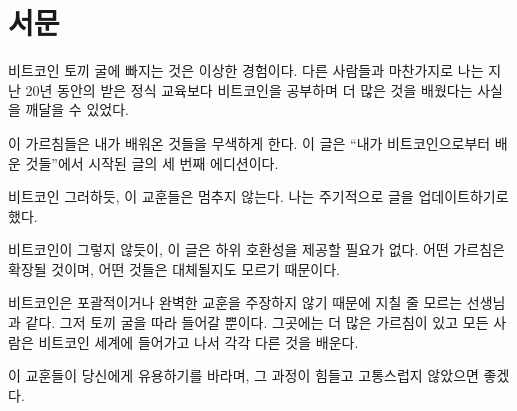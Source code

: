 \chapter*{서문}

비트코인 토끼 굴에 빠지는 것은 이상한 경험이다. 
다른 사람들과 마찬가지로 나는 지난 20년 동안의 받은 정식 교육보다 비트코인을 공부하며
더 많은 것을 배웠다는 사실을 깨달을 수 있었다.

이 가르침들은 내가 배워온 것들을 무색하게 한다. 
이 글은 “내가 비트코인으로부터 배운 것들”에서 시작된 글의 세 번째 에디션이다.

비트코인 그러하듯, 이 교훈들은 멈추지 않는다. 
나는 주기적으로 글을 업데이트하기로 했다.

비트코인이 그렇지 않듯이, 이 글은 하위 호환성을 제공할 필요가 없다. 
어떤 가르침은 확장될 것이며, 어떤 것들은 대체될지도 모르기 때문이다.

비트코인은 포괄적이거나 완벽한 교훈을 주장하지 않기 때문에 지칠 줄 모르는 선생님과 같다. 
그저 토끼 굴을 따라 들어갈 뿐이다.
그곳에는 더 많은 가르침이 있고 모든 사람은 비트코인 세계에 들어가고 나서 각각 다른 것을 배운다.

이 교훈들이 당신에게 유용하기를 바라며, 그 과정이 힘들고 고통스럽지 않았으면 좋겠다.

%
%
